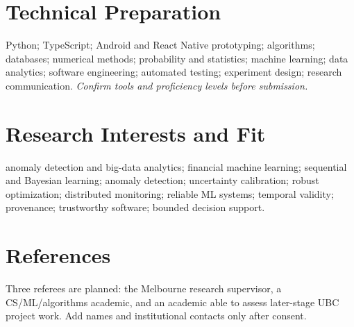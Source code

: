 \documentclass[11pt]{article}
\begin{document}
\section*{Technical Preparation}
Python; TypeScript; Android and React Native prototyping; algorithms; databases; numerical methods; probability and statistics; machine learning; data analytics; software engineering; automated testing; experiment design; research communication. \textit{Confirm tools and proficiency levels before submission.}

\section*{Research Interests and Fit}
anomaly detection and big-data analytics; financial machine learning; sequential and Bayesian learning; anomaly detection; uncertainty calibration; robust optimization; distributed monitoring; reliable ML systems; temporal validity; provenance; trustworthy software; bounded decision support.

\section*{References}
Three referees are planned: the Melbourne research supervisor, a CS/ML/algorithms academic, and an academic able to assess later-stage UBC project work. Add names and institutional contacts only after consent.
\end{document}
